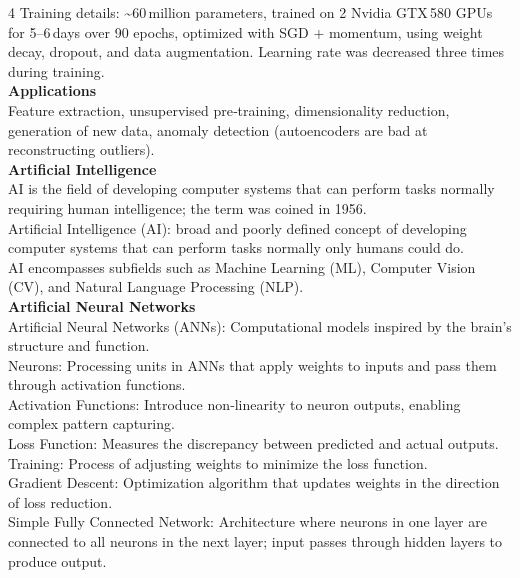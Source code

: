 \documentclass[8pt]{extarticle}
\begin{document}
\begin{multicols}{4}
Training details: \textasciitilde{}60 million parameters, trained on 2 Nvidia GTX 580 GPUs for 5–6 days over 90 epochs, optimized with SGD + momentum, using weight decay, dropout, and data augmentation. Learning rate was decreased three times during training.\\
\vspace{2pt}\textbf{Applications}\\
Feature extraction, unsupervised pre‑training, dimensionality reduction, generation of new data, anomaly detection (autoencoders are bad at reconstructing outliers).\\
\vspace{2pt}\textbf{Artificial Intelligence}\\
AI is the field of developing computer systems that can perform tasks normally requiring human intelligence; the term was coined in 1956.\\
Artificial Intelligence (AI): broad and poorly defined concept of developing computer systems that can perform tasks normally only humans could do.\\
AI encompasses subfields such as Machine Learning (ML), Computer Vision (CV), and Natural Language Processing (NLP).\\
\vspace{2pt}\textbf{Artificial Neural Networks}\\
Artificial Neural Networks (ANNs): Computational models inspired by the brain’s structure and function.\\
Neurons: Processing units in ANNs that apply weights to inputs and pass them through activation functions.\\
Activation Functions: Introduce non‑linearity to neuron outputs, enabling complex pattern capturing.\\
Loss Function: Measures the discrepancy between predicted and actual outputs.\\
Training: Process of adjusting weights to minimize the loss function.\\
Gradient Descent: Optimization algorithm that updates weights in the direction of loss reduction.\\
Simple Fully Connected Network: Architecture where neurons in one layer are connected to all neurons in the next layer; input passes through hidden layers to produce output.\\


\end{multicols}
\end{document}
